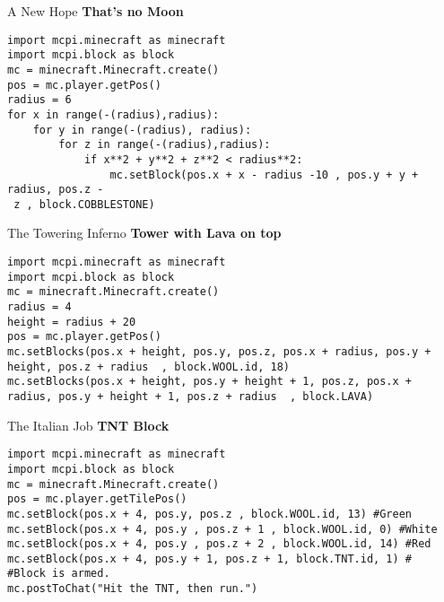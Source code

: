 \documentclass[avery5388,grid]{flashcards}
\begin{document}
\begin{flashcard}[API]{A New Hope}
{\bf That's no Moon}
\begin{lstlisting}
import mcpi.minecraft as minecraft
import mcpi.block as block
mc = minecraft.Minecraft.create()
pos = mc.player.getPos()
radius = 6
for x in range(-(radius),radius):
    for y in range(-(radius), radius):
        for z in range(-(radius),radius):
            if x**2 + y**2 + z**2 < radius**2:
                mc.setBlock(pos.x + x - radius -10 , pos.y + y + radius, pos.z -
 z , block.COBBLESTONE)
\end{lstlisting}
\end{flashcard}


\begin{flashcard}[API]{The Towering Inferno}
{\bf Tower with Lava on top}
\begin{lstlisting}
import mcpi.minecraft as minecraft
import mcpi.block as block
mc = minecraft.Minecraft.create()
radius = 4
height = radius + 20 
pos = mc.player.getPos()
mc.setBlocks(pos.x + height, pos.y, pos.z, pos.x + radius, pos.y + height, pos.z + radius  , block.WOOL.id, 18)
mc.setBlocks(pos.x + height, pos.y + height + 1, pos.z, pos.x + radius, pos.y + height + 1, pos.z + radius  , block.LAVA)
\end{lstlisting}
\end{flashcard}


\begin{flashcard}[API]{The Italian Job}
{\bf TNT Block }
\begin{lstlisting}
import mcpi.minecraft as minecraft
import mcpi.block as block
mc = minecraft.Minecraft.create()
pos = mc.player.getTilePos()
mc.setBlock(pos.x + 4, pos.y, pos.z , block.WOOL.id, 13) #Green
mc.setBlock(pos.x + 4, pos.y , pos.z + 1 , block.WOOL.id, 0) #White
mc.setBlock(pos.x + 4, pos.y , pos.z + 2 , block.WOOL.id, 14) #Red
mc.setBlock(pos.x + 4, pos.y + 1, pos.z + 1, block.TNT.id, 1) #
#Block is armed.
mc.postToChat("Hit the TNT, then run.")
\end{lstlisting}
\end{flashcard}
\end{document}
